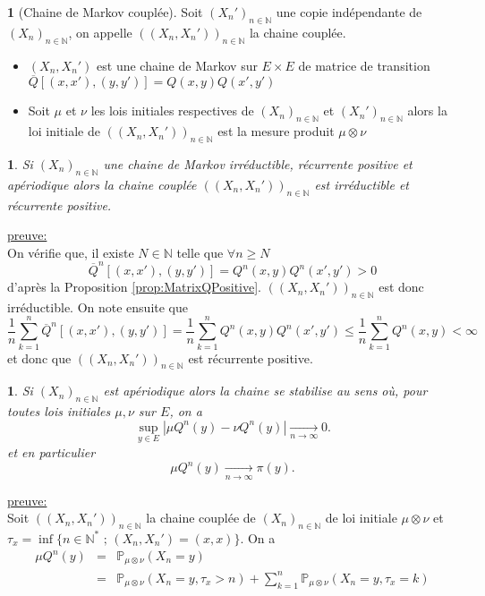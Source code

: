 \documentclass[8pt,notheorems]{beamer}
\def \N{\mathbb N}
\renewcommand{\Pr}{\mathbb{P}}
\newtheorem{theorem}{\translate{Theorem}}[section]
\newtheorem{theorem}{\translate{Theoreme}}
\newtheorem{prop}{\translate{Proposition}}
\theoremstyle{definition}
\newtheorem{definition}{\translate{Definition}}
\theoremstyle{example}
\theoremstyle{mystyle}
\theoremstyle{plain}
\begin{document}
\begin{frame}[allowframebreaks]
\begin{definition}[Chaine de Markov couplée]
Soit $(X_n')_{n\in\N}$ une copie indépendante de $(X_n)_{n\in\N}$, on appelle $((X_n,X_n'))_{n\in\N}$ la chaine couplée.
\begin{itemize}
\item $(X_n,X_n')$ est une chaine de Markov sur $E\times E$ de matrice de transition
$\overline{Q}\left[(x,x'),(y,y')\right]=Q(x,y)Q(x',y')$
\item Soit $\mu$ et $\nu$ les lois initiales respectives de $(X_n)_{n\in\N}$ et $(X_n')_{n\in\N}$ alors la loi initiale de $((X_n,X_n'))_{n\in\N}$ est la mesure produit $\mu\otimes\nu$
\end{itemize}
\end{definition}
\begin{prop}
Si $(X_n)_{n\in\N}$ une chaine de Markov irréductible, récurrente positive et apériodique alors la chaine couplée $((X_n,X_n'))_{n\in\N}$ est irréductible et récurrente positive.
\end{prop}
\underline{preuve:}\\
On vérifie que, il existe $N\in\N$ telle que $\forall n\geq N$
$$
\overline{Q}^{n}\left[(x,x'),(y,y')\right]=Q^{n}(x,y)Q^{n}(x',y')>0
$$
d'après la Proposition \ref{prop:MatrixQPositive}. $((X_n,X_n'))_{n\in\N}$ est donc irréductible. On note ensuite que
$$
\frac{1}{n}\sum_{k=1}^{n}\overline{Q}^{n}\left[(x,x'),(y,y')\right]=\frac{1}{n}\sum_{k=1}^{n}Q^{n}(x,y)Q^{n}(x',y')\leq\frac{1}{n}\sum_{k=1}^{n}Q^{n}(x,y)<\infty
$$
et donc que $((X_n,X_n'))_{n\in\N}$ est récurrente positive.
\begin{theorem}
Si $(X_n)_{n\in\N}$ est apériodique alors la chaine se stabilise au sens où, pour toutes lois initiales $\mu,\nu$ sur $E$, on a
$$
\underset{y\in E}{\sup}|\mu Q^{n}(y)-\nu Q^{n}(y)|\underset{n\longrightarrow\infty}{\rightarrow} 0.
$$
et en particulier
$$
\mu Q^{n}(y) \underset{n\longrightarrow\infty}{\rightarrow} \pi(y).
$$
\end{theorem}
\underline{preuve:}\\
Soit $((X_n,X_n'))_{n\in\N}$ la chaine couplée de $(X_n)_{n\in\N}$ de loi initiale $\mu\otimes\nu$ et $\tau_x=\inf\{n\in\N^{\ast}\text{ ; }(X_n,X_n')=(x,x)\}$. On a
\begin{eqnarray*}
\mu Q^{n}(y)&=&\Pr_{\mu\otimes\nu}(X_n=y)\\
&=&\Pr_{\mu\otimes\nu}(X_n=y,\tau_x>n)+\sum_{k=1}^{n}\Pr_{\mu\otimes\nu}(X_n=y,\tau_x=k)\\

\end{eqnarray*}
\end{frame}
\end{document}
